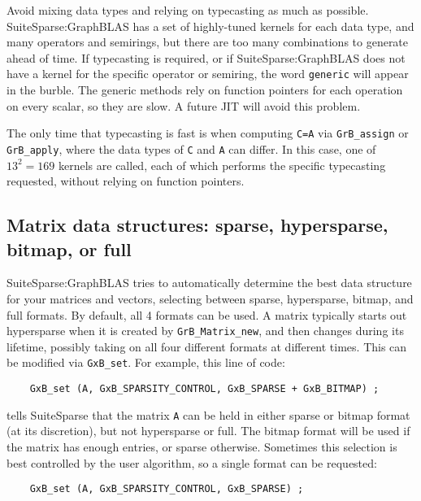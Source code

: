\documentclass[12pt]{article}
\begin{document}
Avoid mixing data types and relying on typecasting as much as possible.
SuiteSparse:GraphBLAS has a set of highly-tuned kernels for each data type,
and many operators and semirings, but there are too many combinations to
generate ahead of time.  If typecasting is required, or if
SuiteSparse:GraphBLAS does not have a kernel for the specific operator or
semiring, the word \verb'generic' will appear in the burble.  The generic
methods rely on function pointers for each operation on every scalar, so they
are slow.  A future JIT will avoid this problem.

The only time that typecasting is fast is when computing \verb'C=A' via
\verb'GrB_assign' or \verb'GrB_apply', where the data types of \verb'C' and
\verb'A' can differ.  In this case, one of $13^2 = 169$ kernels are called,
each of which performs the specific typecasting requested, without relying on
function pointers.

\subsection{Matrix data structures: sparse, hypersparse, bitmap, or full}

SuiteSparse:GraphBLAS tries to automatically determine the best data structure
for your matrices and vectors, selecting between sparse, hypersparse, bitmap,
and full formats.  By default, all 4 formats can be used.  A matrix typically
starts out hypersparse when it is created by \verb'GrB_Matrix_new', and then
changes during its lifetime, possibly taking on all four different formats
at different times.  This can be modified via \verb'GxB_set'.  For example,
this line of code:

    {\scriptsize
    \begin{verbatim}
    GxB_set (A, GxB_SPARSITY_CONTROL, GxB_SPARSE + GxB_BITMAP) ; \end{verbatim}}

\noindent
tells SuiteSparse that the matrix \verb'A' can be held in either sparse or
bitmap format (at its discretion), but not hypersparse or full.  The bitmap
format will be used if the matrix has enough entries, or sparse otherwise.
Sometimes this selection is best controlled by the user algorithm, so a single
format can be requested:

    {\scriptsize
    \begin{verbatim}
    GxB_set (A, GxB_SPARSITY_CONTROL, GxB_SPARSE) ; \end{verbatim}}
\end{document}
